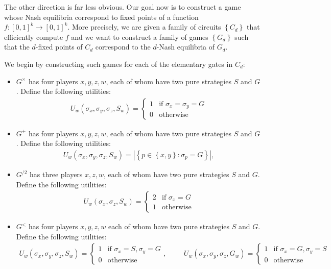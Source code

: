 \documentclass{article}
\begin{document}
The other direction is far less obvious. Our goal now is to
construct a game whose Nash equilibria correspond to fixed points of
a function $f:\left[{0,1}\right]^k\to\left[{0,1}\right]^k$.
More precisely, we are given a family of circuits $\left\lbrace{C_d}\right\rbrace$ that efficiently compute $f$ and we want to construct a
family of games $\left\lbrace{G_d}\right\rbrace$ such that
the $d$-fixed points of $C_d$ correspond to the $d$-Nash equilibria of $G_d$.

We begin by constructing such games for each of the elementary gates
in $C_d$:
\begin{itemize}
  \item $G^\times$ has four players $x,y,z,w$, each of whom have two pure strategies
    $S$ and $G$.
    Define the following utilities:
    \begin{align*}
      U_w(\sigma_x,\sigma_y,\sigma_z, S_w) = \begin{cases}
        1 & \text{if } \sigma_x=\sigma_y= G \\
        0 & \text{otherwise}
      \end{cases}
    \end{align*}
  \item $G^+$ has four players $x,y,z,w$, each of whom have two pure strategies
    $S$ and $G$.
    Define the following utilities:
    \begin{align*}
      U_w(\sigma_x,\sigma_y,\sigma_z, S_w) = |\left\lbrace{p\in\left\lbrace{x,y}\right\rbrace : \sigma_p = G}\right\rbrace|,
    \end{align*}
  \item $G^{/2}$ has three players $x,z,w$, each of whom have two pure strategies
    $S$ and $G$.
    Define the following utilities:
    \begin{align*}
      U_w(\sigma_x,\sigma_z, S_w) = \begin{cases}
        2 & \text{if } \sigma_x= G \\
        1 & \text{otherwise}
      \end{cases}
    \end{align*}
  \item $G^<$ has four players $x,y,z,w$ each of whom have two pure strategies $S$ and $G$. Define the following utilities:
    \begin{align*}
      U_w(\sigma_x,\sigma_y,\sigma_z,S_w) = \begin{cases}
        1 & \text{if }\sigma_x = S,\sigma_y = G\\
        0 & \text{otherwise}
      \end{cases}, \hspace{1cm}
      U_w(\sigma_x,\sigma_y,\sigma_z,G_w) = \begin{cases}
        1 & \text{if }\sigma_x = G,\sigma_y = S\\
        0 & \text{otherwise}
      \end{cases}
    \end{align*}
\end{itemize}
\end{document}
